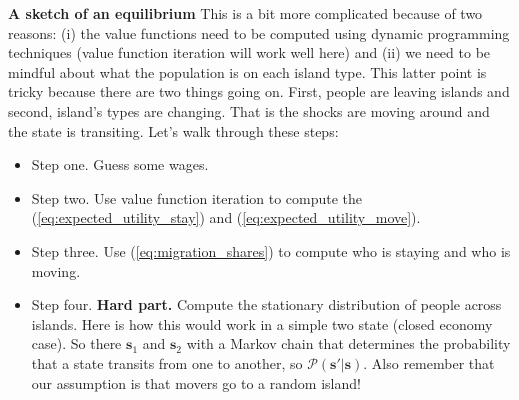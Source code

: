 \documentclass[pdftex,12pt]{article}
\begin{document}
\medskip
\noindent \textbf{A sketch of an equilibrium} This is a bit more complicated because of two reasons: (i) the value functions need to be computed using dynamic programming techniques (value function iteration will work well here) and (ii) we need to be mindful about what the population is on each island type. This latter point is tricky because there are two things going on. First, people are leaving islands and second, island's types are changing. That is the shocks are moving around and the state is transiting. Let's walk through these steps:
\begin{itemize}
\item Step one. Guess some wages.

\item Step two. Use value function iteration to compute the (\ref{eq:expected_utility_stay}) and (\ref{eq:expected_utility_move}).

\item Step three. Use (\ref{eq:migration_shares}) to compute who is staying and who is moving.

\item Step four. \textbf{Hard part.} Compute the stationary distribution of people across islands. Here is how this would work in a simple two state (closed economy case). So there $\textbf{s}_1$ and $\textbf{s}_2$ with a Markov chain that determines the probability that a state transits from one to another, so $\mathcal{P}(\textbf{s}' | \textbf{s})$. Also remember that our assumption is that movers go to a random island! 


\end{itemize}
\end{document}
